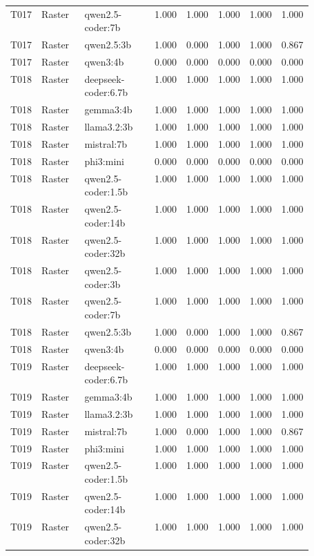 \begin{longtable}{p{0.08\linewidth}p{0.16\linewidth}p{0.27\linewidth}rrrrr}
T017 & Raster & qwen2.5-coder:7b & 1.000 & 1.000 & 1.000 & 1.000 & 1.000 \\
T017 & Raster & qwen2.5:3b & 1.000 & 0.000 & 1.000 & 1.000 & 0.867 \\
T017 & Raster & qwen3:4b & 0.000 & 0.000 & 0.000 & 0.000 & 0.000 \\
T018 & Raster & deepseek-coder:6.7b & 1.000 & 1.000 & 1.000 & 1.000 & 1.000 \\
T018 & Raster & gemma3:4b & 1.000 & 1.000 & 1.000 & 1.000 & 1.000 \\
T018 & Raster & llama3.2:3b & 1.000 & 1.000 & 1.000 & 1.000 & 1.000 \\
T018 & Raster & mistral:7b & 1.000 & 1.000 & 1.000 & 1.000 & 1.000 \\
T018 & Raster & phi3:mini & 0.000 & 0.000 & 0.000 & 0.000 & 0.000 \\
T018 & Raster & qwen2.5-coder:1.5b & 1.000 & 1.000 & 1.000 & 1.000 & 1.000 \\
T018 & Raster & qwen2.5-coder:14b & 1.000 & 1.000 & 1.000 & 1.000 & 1.000 \\
T018 & Raster & qwen2.5-coder:32b & 1.000 & 1.000 & 1.000 & 1.000 & 1.000 \\
T018 & Raster & qwen2.5-coder:3b & 1.000 & 1.000 & 1.000 & 1.000 & 1.000 \\
T018 & Raster & qwen2.5-coder:7b & 1.000 & 1.000 & 1.000 & 1.000 & 1.000 \\
T018 & Raster & qwen2.5:3b & 1.000 & 0.000 & 1.000 & 1.000 & 0.867 \\
T018 & Raster & qwen3:4b & 0.000 & 0.000 & 0.000 & 0.000 & 0.000 \\
T019 & Raster & deepseek-coder:6.7b & 1.000 & 1.000 & 1.000 & 1.000 & 1.000 \\
T019 & Raster & gemma3:4b & 1.000 & 1.000 & 1.000 & 1.000 & 1.000 \\
T019 & Raster & llama3.2:3b & 1.000 & 1.000 & 1.000 & 1.000 & 1.000 \\
T019 & Raster & mistral:7b & 1.000 & 0.000 & 1.000 & 1.000 & 0.867 \\
T019 & Raster & phi3:mini & 1.000 & 1.000 & 1.000 & 1.000 & 1.000 \\
T019 & Raster & qwen2.5-coder:1.5b & 1.000 & 1.000 & 1.000 & 1.000 & 1.000 \\
T019 & Raster & qwen2.5-coder:14b & 1.000 & 1.000 & 1.000 & 1.000 & 1.000 \\
T019 & Raster & qwen2.5-coder:32b & 1.000 & 1.000 & 1.000 & 1.000 & 1.000 \\

\end{longtable}
